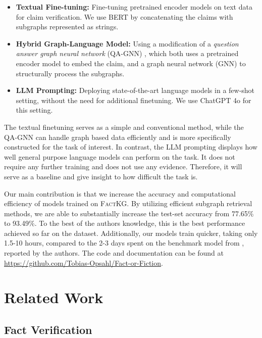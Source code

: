 \documentclass[11pt]{article}
\begin{document}
\begin{itemize}
    \item \textbf{Textual Fine-tuning:} Fine-tuning pretrained encoder models on text data for claim verification. We use BERT \citep{devlin2018bert} by concatenating the claims with subgraphs represented as strings.

    \item \textbf{Hybrid Graph-Language Model:} Using a modification of a \emph{question answer graph neural network} (QA-GNN) \citep{yasunaga2021qa_gnn}, which both uses a pretrained encoder model to embed the claim, and a graph neural network (GNN) to structurally process the subgraphs.

    \item \textbf{LLM Prompting:} Deploying state-of-the-art language models in a few-shot setting, without the need for additional finetuning. We use ChatGPT 4o \citep{achiam2023gpt4, 2024chatgpt4o} for this setting.
\end{itemize}

The textual finetuning serves as a simple and conventional method, while the QA-GNN can handle graph based data efficiently and is more specifically constructed for the task of interest. In contrast, the LLM prompting displays how well general purpose language models can perform on the task. It does not require any further training and does not use any evidence. Therefore, it will serve as a baseline and give insight to how difficult the task is.

Our main contribution is that we increase the accuracy and computational efficiency of models trained on \textsc{FactKG}. By utilizing efficient subgraph retrieval methods, we are able to substantially increase the test-set accuracy from 77.65\% \citep{kim2023factkg} to 93.49\%. To the best of the authors knowledge, this is the best performance achieved so far on the dataset. Additionally, our models train quicker, taking only 1.5-10 hours, compared to the 2-3 days spent on the benchmark model from \citet{kim2023factkg}, reported by the authors. The code and documentation can be found at \url{https://github.com/Tobias-Opsahl/Fact-or-Fiction}.

\section{Related Work}

\subsection{Fact Verification}
\end{document}
